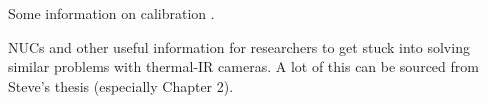 Some information on calibration \cite{Vidas2012a}.

NUCs and other useful information for researchers to get stuck into solving similar problems with thermal-IR cameras.
A lot of this can be sourced from Steve's thesis (especially Chapter 2).
